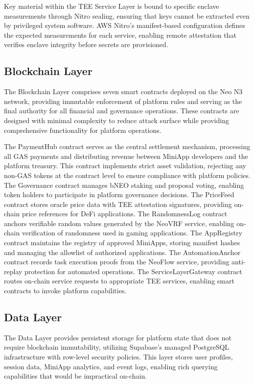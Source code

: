 \documentclass[11pt,a4paper]{article}
\begin{document}
Key material within the TEE Service Layer is bound to specific enclave measurements through Nitro sealing, ensuring that keys cannot be extracted even by privileged system software. AWS Nitro's manifest-based configuration defines the expected measurements for each service, enabling remote attestation that verifies enclave integrity before secrets are provisioned.

\subsection{Blockchain Layer}

The Blockchain Layer comprises seven smart contracts deployed on the Neo N3 network, providing immutable enforcement of platform rules and serving as the final authority for all financial and governance operations. These contracts are designed with minimal complexity to reduce attack surface while providing comprehensive functionality for platform operations.

The PaymentHub contract serves as the central settlement mechanism, processing all GAS payments and distributing revenue between MiniApp developers and the platform treasury. This contract implements strict asset validation, rejecting any non-GAS tokens at the contract level to ensure compliance with platform policies. The Governance contract manages bNEO staking and proposal voting, enabling token holders to participate in platform governance decisions. The PriceFeed contract stores oracle price data with TEE attestation signatures, providing on-chain price references for DeFi applications. The RandomnessLog contract anchors verifiable random values generated by the NeoVRF service, enabling on-chain verification of randomness used in gaming applications. The AppRegistry contract maintains the registry of approved MiniApps, storing manifest hashes and managing the allowlist of authorized applications. The AutomationAnchor contract records task execution proofs from the NeoFlow service, providing anti-replay protection for automated operations. The ServiceLayerGateway contract routes on-chain service requests to appropriate TEE services, enabling smart contracts to invoke platform capabilities.

\subsection{Data Layer}

The Data Layer provides persistent storage for platform state that does not require blockchain immutability, utilizing Supabase's managed PostgreSQL infrastructure with row-level security policies. This layer stores user profiles, session data, MiniApp analytics, and event logs, enabling rich querying capabilities that would be impractical on-chain.
\end{document}
